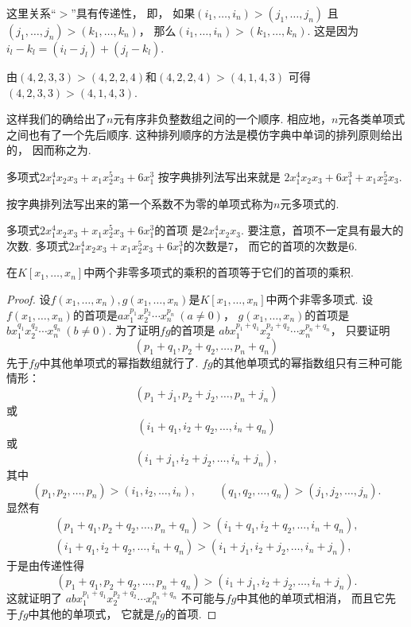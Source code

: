 这里关系“\(>\)”具有传递性，
即，
如果\((i_1,\dotsc,i_n)>(j_1,\dotsc,j_n)\)
且\((j_1,\dotsc,j_n)>(k_1,\dotsc,k_n)\)，
那么\((i_1,\dotsc,i_n)>(k_1,\dotsc,k_n)\).
这是因为\(i_l-k_l=(i_l-j_l)+(j_l-k_l)\).

\begin{example}
由\((4,2,3,3)>(4,2,2,4)\)和\((4,2,2,4)>(4,1,4,3)\)
可得\((4,2,3,3)>(4,1,4,3)\).
\end{example}

这样我们的确给出了\(n\)元有序非负整数组之间的一个顺序.
相应地，\(n\)元各类单项式之间也有了一个先后顺序.
这种排列顺序的方法是模仿字典中单词的排列原则给出的，
因而称之为.

\begin{example}
多项式\(2x_1^4x_2x_3+x_1x_2^5x_3+6x_1^3\)
按字典排列法写出来就是
\(2x_1^4x_2x_3+6x_1^3+x_1x_2^5x_3\).
\end{example}

按字典排列法写出来的第一个系数不为零的单项式称为\(n\)元多项式的.

\begin{example}
多项式\(2x_1^4x_2x_3+x_1x_2^5x_3+6x_1^3\)的首项
是\(2x_1^4x_2x_3\).
要注意，首项不一定具有最大的次数.
多项式\(2x_1^4x_2x_3+x_1x_2^5x_3+6x_1^3\)的次数是7，
而它的首项的次数是6.
\end{example}

\begin{theorem}\label{theorem:多项式.多元多项式环.两个非零多项式的乘积的首项等于它们的首项的乘积}
在\(K[x_1,\dotsc,x_n]\)中两个非零多项式的乘积的首项等于它们的首项的乘积.
\begin{proof}
设\(f(x_1,\dotsc,x_n),g(x_1,\dotsc,x_n)\)是\(K[x_1,\dotsc,x_n]\)中两个非零多项式.
设\(f(x_1,\dotsc,x_n)\)的首项是\(a x_1^{p_1} x_2^{p_2} \dotsm x_n^{p_n}\ (a\neq0)\)，
\(g(x_1,\dotsc,x_n)\)的首项是\(b x_1^{q_1} x_2^{q_2} \dotsm x_n^{q_n}\ (b\neq0)\).
为了证明\(fg\)的首项是
\(ab x_1^{p_1+q_1} x_2^{p_2+q_2} \dotsm x_n^{p_n+q_n}\)，
只要证明\[
	(p_1+q_1,p_2+q_2,\dotsc,p_n+q_n)
\]先于\(fg\)中其他单项式的幂指数组就行了.
\(fg\)的其他单项式的幂指数组只有三种可能情形：\[
	(p_1+j_1,p_2+j_2,\dotsc,p_n+j_n)
\]或\[
	(i_1+q_1,i_2+q_2,\dotsc,i_n+q_n)
\]或\[
	(i_1+j_1,i_2+j_2,\dotsc,i_n+j_n),
\]
其中\[
	(p_1,p_2,\dotsc,p_n)
	>
	(i_1,i_2,\dotsc,i_n), \qquad
	(q_1,q_2,\dotsc,q_n)
	>
	(j_1,j_2,\dotsc,j_n).
\]
显然有\begin{gather*}
	(p_1+q_1,p_2+q_2,\dotsc,p_n+q_n)
	>
	(i_1+q_1,i_2+q_2,\dotsc,i_n+q_n), \\
	(i_1+q_1,i_2+q_2,\dotsc,i_n+q_n)
	>
	(i_1+j_1,i_2+j_2,\dotsc,i_n+j_n),
\end{gather*}
于是由传递性得\[
	(p_1+q_1,p_2+q_2,\dotsc,p_n+q_n)
	>
	(i_1+j_1,i_2+j_2,\dotsc,i_n+j_n).
\]
这就证明了
\(ab x_1^{p_1+q_1} x_2^{p_2+q_2} \dotsm x_n^{p_n+q_n}\)
不可能与\(fg\)中其他的单项式相消，
而且它先于\(fg\)中其他的单项式，
它就是\(fg\)的首项.
\end{proof}
\end{theorem}

